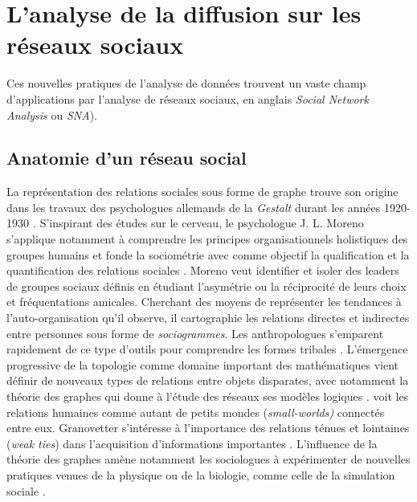 \section[L{\textquoteright}analyse de la diffusion sur les réseaux sociaux]{L{\textquoteright}analyse de la diffusion sur les réseaux sociaux}

Ces nouvelles pratiques de l'analyse de données trouvent un vaste champ d'applications par l{\textquoteright}analyse de réseaux sociaux, en anglais \textit{Social Network Analysis} ou \textit{SNA}). 


\subsection[Anatomie d{\textquoteright}un réseau social]{ Anatomie d{\textquoteright}un réseau social}

La représentation des relations sociales sous forme de graphe trouve son origine dans les travaux des psychologues allemands de la \textit{Gestalt} durant les années 1920-1930 \citep{Scott1988}\textit{. }S{\textquoteright}inspirant des études sur le cerveau, le psychologue J. L. Moreno s{\textquoteright}applique notamment à comprendre les principes organisationnels holistiques des groupes humains et fonde la sociométrie avec comme objectif la qualification et la quantification des relations sociales \citep{Moreno1938}. Moreno veut identifier et isoler des leaders de groupes sociaux définis en étudiant l{\textquoteright}asymétrie ou la réciprocité de leurs choix et fréquentations amicales. Cherchant des moyens de représenter les tendances à l{\textquoteright}auto-organisation qu{\textquoteright}il observe, il cartographie les relations directes et indirectes entre personnes sous forme de \textit{sociogrammes}. Les anthropologues s{\textquoteright}emparent rapidement de ce type d{\textquoteright}outils pour comprendre les formes tribales \citep{Lundberg1975}. L{\textquoteright}émergence progressive de la topologie comme domaine important des mathématiques vient définir de nouveaux types de relations entre objets disparates, avec notamment la théorie des graphes qui donne à l{\textquoteright}étude des réseaux ses modèles logiques \citep{Harary1977}. \cite{Travers1969} voit les relations humaines comme autant de petits mondes (\textit{small-worlds)} connectés entre eux. Granovetter s{\textquoteright}intéresse à l{\textquoteright}importance des relations ténues et lointaines (\textit{weak ties}) dans l{\textquoteright}acquisition d{\textquoteright}informations importantes \citep{Granovetter1973}. L{\textquoteright}influence de la théorie des graphes amène notamment les sociologues à expérimenter de nouvelles pratiques venues de la physique ou de la biologie, comme celle de la simulation sociale \citep{Epstein1996}. 


